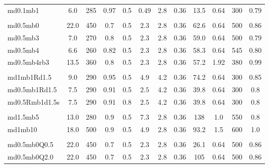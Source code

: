 \begin{table*}
\begin{center}
\begin{tabular}{lccccccccccc}
md0.1mb1  & 6.0 &  285 & 0.97 & 0.5 &$0.49$ & 2.8 & 0.36 & 13.5  & 0.64 & 300 & 0.79 \\
\\
md0.5mb0  & 22.0 &  450 & 0.7 & 0.5 & $2.3$ & 2.8 & 0.36 & 62.6  & 0.64 & 500 & 0.86 \\
md0.5mb3  & 7.0 &  270 & 0.8 & 0.5 & $2.3$ & 2.8 & 0.36 & 59.0  & 0.64 & 500 & 0.79 \\
md0.5mb4  & 6.6 &  260 & 0.82 & 0.5 & $2.3$ & 2.8 & 0.36 & 58.3  & 0.64 & 545 & 0.80 \\
md0.5mb4rb3  & 13.5 &  360 & 0.8 & 0.5 & $2.3$ & 2.8 & 0.36 & 57.2  & 1.92 & 380 & 0.99 \\
\\
md1mb1Rd1.5      &  9.0 &  290 & 0.95 & 0.5 & $4.9$ & 4.2 & 0.36 & 74.2  & 0.64 & 300 & 0.85 \\
md0.5mb1Rd1.5     &  7.5 &  290 & 0.91 & 0.5 & $2.5$ & 4.2 & 0.36 & 39.8  & 0.64 & 300 & 0.8 \\
md0.5Rmb1d1.5s &  7.5 &  290 & 0.91 & 0.8 & $2.5$ & 4.2 & 0.36 & 39.8  & 0.64 & 300 & 0.8 \\
\\
md1.5mb5      & 13.0 & 280 & 0.9 & 0.5 & 7.3 &  2.8 & 0.36 & 138 & 1.0 & 550 & 0.8 \\
md1mb10       & 18.0 & 500 & 0.9 & 0.5 & 4.9 & 2.8 & 0.36  & 93.2 & 1.5 & 600 & 1.0 \\
\\
md0.5mb0Q0.5  & 22.0 &  450 & 0.7 & 0.5 & $2.3$ & 2.8 & 0.36 & 26.1  & 0.64 & 500 & 0.86 \\
md0.5mb0Q2.0  & 22.0 &  450 & 0.7 & 0.5 & $2.3$ & 2.8 & 0.36 & 105  & 0.64 & 500 & 0.86 \\
\hline
\end{tabular}
\end{center}
\end{table*}


